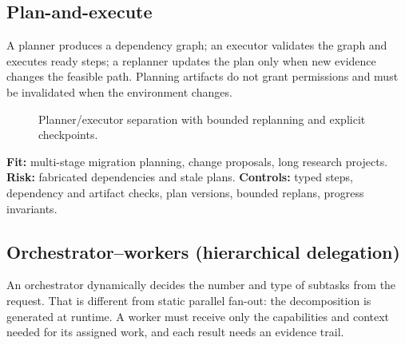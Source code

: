 \subsection{Plan-and-execute}
A planner produces a dependency graph; an executor validates the graph and executes ready steps; a replanner updates the plan only when new evidence changes the feasible path. Planning artifacts do not grant permissions and must be invalidated when the environment changes.

\begin{figure}[htbp]\centering
{}
\caption{Planner/executor separation with bounded replanning and explicit checkpoints.}
\label{fig:plan}
\end{figure}

\textbf{Fit:} multi-stage migration planning, change proposals, long research projects. \textbf{Risk:} fabricated dependencies and stale plans. \textbf{Controls:} typed steps, dependency and artifact checks, plan versions, bounded replans, progress invariants.

\subsection{Orchestrator--workers (hierarchical delegation)}
An orchestrator dynamically decides the number and type of subtasks from the request. That is different from static parallel fan-out: the decomposition is generated at runtime. A worker must receive only the capabilities and context needed for its assigned work, and each result needs an evidence trail.

